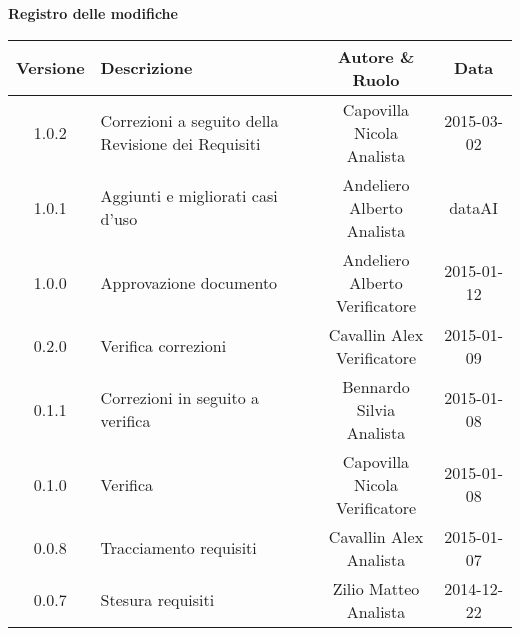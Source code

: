 \begin{center}
\Large{\textbf{Registro delle modifiche}}
\\\vspace{0.5cm}
\normalsize
\begin{tabularx}{\textwidth}{cXcc}
\textbf{Versione} & \textbf{Descrizione} & \textbf{Autore \& Ruolo} & \textbf{Data} \\
\toprule

1.0.2 & Correzioni a seguito della Revisione dei Requisiti & \multicell{Capovilla Nicola \\ Analista} & 2015-03-02  \\\midrule
1.0.1 & Aggiunti e migliorati casi d'uso & \multicell{Andeliero Alberto \\ Analista} & dataAI \\\midrule
1.0.0 & Approvazione documento & \multicell{Andeliero Alberto \\ Verificatore} & 2015-01-12  \\\midrule
0.2.0 & Verifica correzioni & \multicell{Cavallin Alex \\ Verificatore} & 2015-01-09\\\midrule
0.1.1 & Correzioni in seguito a verifica & \multicell{Bennardo Silvia \\ Analista} & 2015-01-08 \\\midrule
0.1.0 & Verifica & \multicell{Capovilla Nicola \\ Verificatore} & 2015-01-08 \\\midrule
0.0.8 & Tracciamento requisiti & \multicell{Cavallin Alex \\ Analista} & 2015-01-07 \\\midrule
0.0.7 & Stesura requisiti & \multicell{Zilio Matteo \\ Analista} & 2014-12-22 \\\midrule

\end{tabularx}
\end{center}
